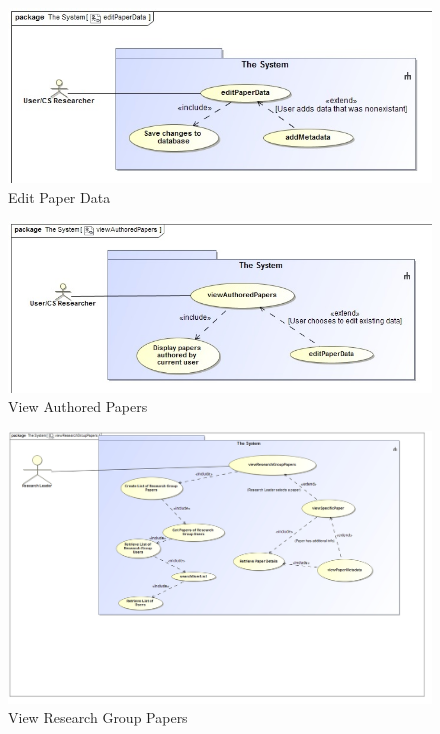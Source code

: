\documentclass[a4paper,12pt]{article}
\begin{document}
\begin{figure}[H]
    \centering
    \caption{Edit Paper Data}
    \includegraphics[width=1\textwidth]{req-func/uc__The_System__editPaperData.jpg}
\end{figure}

\begin{figure}[H]
    \centering
    \caption{View Authored Papers}
    \includegraphics[width=1\textwidth]{req-func/uc__The_System__viewAuthoredPapers.jpg}
\end{figure}

\begin{figure}[H]
    \centering
    \caption{View Research Group Papers}
    \includegraphics[width=1\textwidth]{req-func/uc__The_System__viewResearchGroupPapers.jpg}
\end{figure}
\end{document}
